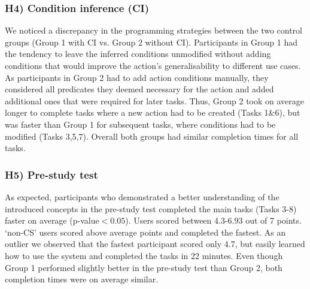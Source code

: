 \subsubsection*{\textbf{H4) Condition inference (CI)}} 
We noticed a discrepancy in the programming strategies between the two control groups (Group 1 with CI vs. Group 2 without CI).
Participants in Group 1 had the tendency to leave the inferred conditions unmodified without adding conditions that would improve the action's generalisability to different use cases.
As participants in Group 2 had to add action conditions manually, they considered all predicates they deemed necessary for the action and added additional ones that were required for later tasks.
Thus, Group 2 took on average longer to complete tasks where a new action had to be created (Tasks 1\&6), but was faster than Group 1 for subsequent tasks, where conditions had to be modified (Tasks 3,5,7).
Overall both groups had similar completion times for all tasks.

\subsubsection*{\textbf{H5) Pre-study test}} 
As expected, participants who demonstrated a better understanding of the introduced concepts in the pre-study test completed the main tasks (Tasks 3-8) faster on average (p-value$<0.05$).
Users scored between 4.3-6.93 out of 7 points.
`non-CS' users scored above average points and completed the fastest.
As an outlier we observed that the fastest participant scored only 4.7, but easily learned how to use the system and completed the tasks in 22 minutes.
Even though Group 1 performed slightly better in the pre-study test than Group 2, both completion times were on average similar.


